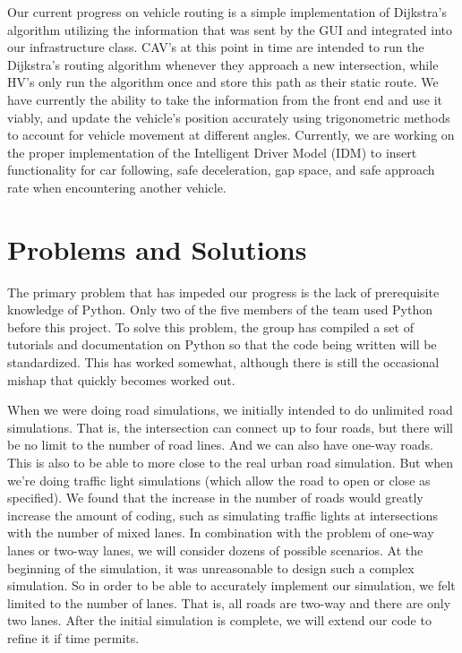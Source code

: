\documentclass[onecolumn, draftclsnofoot,10pt, compsoc]{IEEEtran}
\begin{document}
Our current progress on vehicle routing is a simple implementation of Dijkstra’s algorithm utilizing the information that was sent by the GUI and integrated into our infrastructure class. CAV’s at this point in time are intended to run the Dijkstra’s routing algorithm whenever they approach a new intersection, while HV’s only run the algorithm once and store this path as their static route. We have currently the ability to take the information from the front end and use it viably, and update the vehicle’s position accurately using trigonometric methods to account for vehicle movement at different angles. Currently, we are working on the proper implementation of the Intelligent Driver Model (IDM) to insert functionality for car following, safe deceleration, gap space, and safe approach rate when encountering another vehicle.
\section{Problems and Solutions}
The primary problem that has impeded our progress is the lack of prerequisite knowledge of Python. Only two of the five members of the team used Python before this project. To solve this problem, the group has compiled a set of tutorials and documentation on Python so that the code being written will be standardized. This has worked somewhat, although there is still the occasional mishap that quickly becomes worked out.

When we were doing road simulations, we initially intended to do unlimited road simulations. That is, the intersection can connect up to four roads, but there will be no limit to the number of road lines. And we can also have one-way roads. This is also to be able to more close to the real urban road simulation. But when we're doing traffic light simulations (which allow the road to open or close as specified). We found that the increase in the number of roads would greatly increase the amount of coding, such as simulating traffic lights at intersections with the number of mixed lanes. In combination with the problem of one-way lanes or two-way lanes, we will consider dozens of possible scenarios. At the beginning of the simulation, it was unreasonable to design such a complex simulation. So in order to be able to accurately implement our simulation, we felt limited to the number of lanes. That is, all roads are two-way and there are only two lanes. After the initial simulation is complete, we will extend our code to refine it if time permits.
\end{document}
